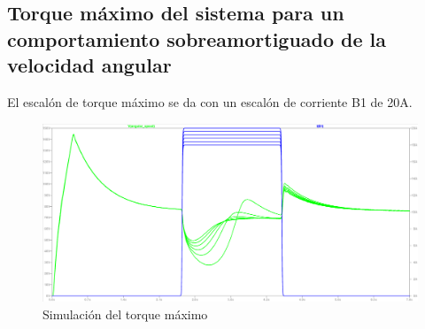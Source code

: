 \documentclass[e4_tp3_main.tex]{subfiles}
\begin{document}
\vspace{0.5cm}

\subsection{Torque m\'aximo del sistema para un comportamiento sobreamortiguado de la velocidad angular}

El escal\'on de torque m\'aximo se da con un escal\'on de corriente B1 de 20A. 

\begin{figure}[H]
	\centering
	\includegraphics[width=0.8\linewidth]{Imagenes/3-torquemax.png}
	\caption{Simulación del torque m\'aximo}
	\label{fig:torqmax}
\end{figure}
\end{document}
